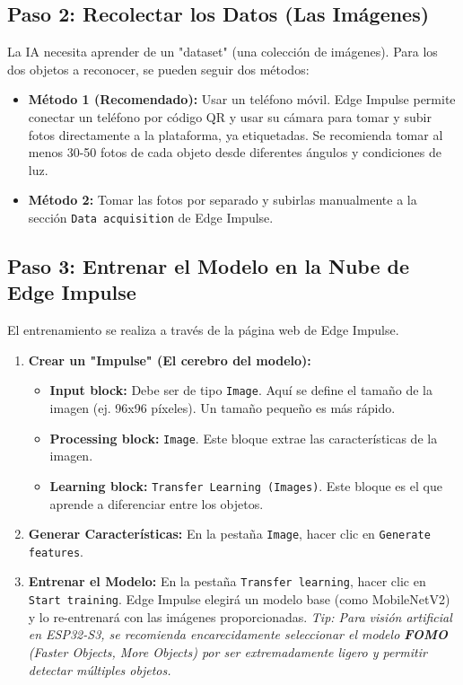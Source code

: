 \documentclass[12pt, a4paper]{article}
\begin{document}
\subsection{Paso 2: Recolectar los Datos (Las Imágenes)}
La IA necesita aprender de un "dataset" (una colección de imágenes). Para los dos objetos a reconocer, se pueden seguir dos métodos:
\begin{itemize}
    \item \textbf{Método 1 (Recomendado):} Usar un teléfono móvil. Edge Impulse permite conectar un teléfono por código QR y usar su cámara para tomar y subir fotos directamente a la plataforma, ya etiquetadas. Se recomienda tomar al menos 30-50 fotos de cada objeto desde diferentes ángulos y condiciones de luz.
    \item \textbf{Método 2:} Tomar las fotos por separado y subirlas manualmente a la sección \texttt{Data acquisition} de Edge Impulse.
\end{itemize}

\subsection{Paso 3: Entrenar el Modelo en la Nube de Edge Impulse}
El entrenamiento se realiza a través de la página web de Edge Impulse.
\begin{enumerate}
    \item \textbf{Crear un "Impulse" (El cerebro del modelo):}
    \begin{itemize}
        \item \textbf{Input block:} Debe ser de tipo \texttt{Image}. Aquí se define el tamaño de la imagen (ej. 96x96 píxeles). Un tamaño pequeño es más rápido.
        \item \textbf{Processing block:} \texttt{Image}. Este bloque extrae las características de la imagen.
        \item \textbf{Learning block:} \texttt{Transfer Learning (Images)}. Este bloque es el que aprende a diferenciar entre los objetos.
    \end{itemize}
    \item \textbf{Generar Características:} En la pestaña \texttt{Image}, hacer clic en \texttt{Generate features}.
    \item \textbf{Entrenar el Modelo:} En la pestaña \texttt{Transfer learning}, hacer clic en \texttt{Start training}. Edge Impulse elegirá un modelo base (como MobileNetV2) y lo re-entrenará con las imágenes proporcionadas. \textit{Tip: Para visión artificial en ESP32-S3, se recomienda encarecidamente seleccionar el modelo \textbf{FOMO} (Faster Objects, More Objects) por ser extremadamente ligero y permitir detectar múltiples objetos.}
\end{enumerate}
\end{document}
